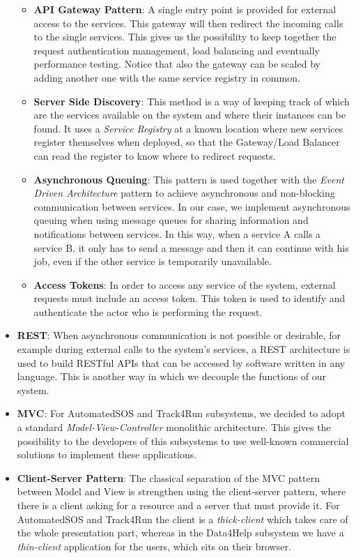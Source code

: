 \begin{itemize}
	\begin{itemize}
		\item \textbf{API Gateway Pattern}: A single entry point is provided for external access to the services. This gateway will then redirect the incoming calls to the single services. This gives us the possibility to keep together the request authentication management, load balancing and eventually performance testing. Notice that also the gateway can be scaled by adding another one with the same service registry in common.
		\item \textbf{Server Side Discovery}: This method is a way of keeping track of which are the services available on the system and where their instances can be found. It uses a \textit{Service Registry} at a known location where new services register themselves when deployed, so that the Gateway/Load Balancer can read the register to know where to redirect requests.
		\item \textbf{Asynchronous Queuing}: This pattern is used together with the \textit{Event Driven Architecture} pattern to achieve asynchronous and non-blocking communication between services. In our case, we implement asynchronous queuing when using message queues for sharing information and notifications between services. In this way, when a service A calls a service B, it only has to send a message and then it can continue with his job, even if the other service is temporarily unavailable.
		\item \textbf{Access Tokens}: In order to access any service of the system, external requests must include an access token. This token is used to identify and authenticate the actor who is performing the request.
	\end{itemize}

	\item \textbf{REST}: When asynchronous communication is not possible or desirable, for example during external calls to the system's services, a REST architecture is used to build RESTful APIs that can be accessed by software written in any language. This is another way in which we decouple the functions of our system.
	\item \textbf{MVC}: For AutomatedSOS and Track4Run subsystems, we decided to adopt a standard \textit{Model-View-Controller} monolithic architecture. This gives the possibility to the developers of this subsystems to use well-known commercial solutions to implement these applications.
	\item \textbf{Client-Server Pattern}: The classical separation of the MVC pattern between Model and View is strengthen using the client-server pattern, where there is a client asking for a resource and a server that must provide it. For AutomatedSOS and Track4Run the client is a \textit{thick-client} which takes care of the whole presentation part, whereas in the Data4Help subsystem we have a \textit{thin-client} application for the users, which sits on their browser.
\end{itemize}

